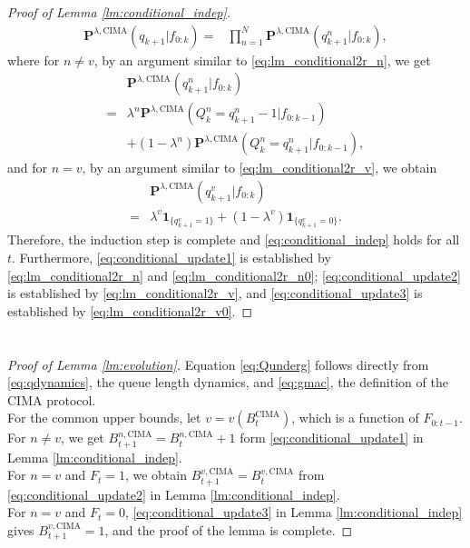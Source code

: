 \documentclass[onecolumn,draftcls]{IEEEtran}
\newcommand{\g}{\text{CIMA}}
\begin{document}
\begin{proof}[Proof of Lemma \ref{lm:conditional_indep}]
\begin{align}
\mathbf{P}^{\lambda,\g}(q_{k+1}|f_{0:k})
= & \prod_{n=1}^N \mathbf{P}^{\lambda,\g}(q^n_{k+1}|f_{0:k}),
\end{align}
where for $n\neq v$, by an argument similar to \eqref{eq:lm_conditional2r_n}, we get
\begin{align}
&\mathbf{P}^{\lambda,\g}(q^n_{k+1}|f_{0:k}) \nonumber\\
=&\lambda^n\mathbf{P}^{\lambda,\g}(Q^n_k = q^n_{k+1}-1|f_{0:k-1})
\nonumber\\
&+(1-\lambda^n)\mathbf{P}^{\lambda,\g}(Q^n_k = q^n_{k+1}|f_{0:k-1}),
\label{eq:lm_conditional2r_n0}
\end{align}
and for $n=v$, by an argument similar to \eqref{eq:lm_conditional2r_v}, we obtain
\begin{align}
&\mathbf{P}^{\lambda,\g}(q^v_{k+1}|f_{0:k})  \nonumber\\
= & \lambda^v \mathbf{1}_{\{q^v_{k+1}=1\}}+ (1-\lambda^v)\mathbf{1}_{\{q^v_{k+1}=0\}}.
\label{eq:lm_conditional2r_v0}
\end{align}
Therefore, the induction step is complete and \eqref{eq:conditional_indep} holds for all $t$.
Furthermore, \eqref{eq:conditional_update1} is established by \eqref{eq:lm_conditional2r_n} and \eqref{eq:lm_conditional2r_n0};
\eqref{eq:conditional_update2} is established by \eqref{eq:lm_conditional2r_v}, and \eqref{eq:conditional_update3} is established by \eqref{eq:lm_conditional2r_v0}.

\end{proof}

\section{}
\label{app:lm2}
\begin{proof}[Proof of Lemma \ref{lm:evolution}]
Equation \eqref{eq:Qunderg} follows directly from \eqref{eq:qdynamics}, the queue length dynamics, and \eqref{eq:gmac}, the definition of the $\g$ protocol.
\\
For the common upper bounds, 
let $v = v(B^{\g}_t)$, which is a function of $F_{0:t-1}$.
\\
For $n \neq v$,  we get $B^{n,\g}_{t+1} = B^{n,\g}_{t}+1$ form \eqref{eq:conditional_update1} in Lemma \ref{lm:conditional_indep}.
\\
For $n = v$ and $F_{t} =1$, we obtain
$B^{v,\g}_{t+1} = B^{v,\g}_{t}$ from \eqref{eq:conditional_update2} in Lemma \ref{lm:conditional_indep}.
\\
For $n = v$ and $F_t = 0$, \eqref{eq:conditional_update3} in Lemma \ref{lm:conditional_indep} gives $B^{v,\g}_{t+1} = 1$, and the proof of the lemma is complete.

\end{proof}
\end{document}
